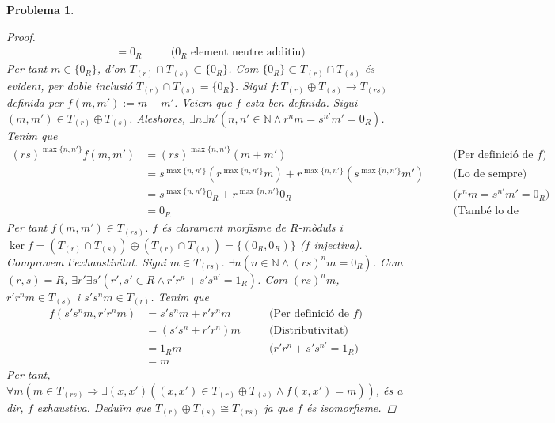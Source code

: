 \documentclass[compress]{article}
\newtheorem{problema}{Problema}
\theoremstyle{definition}
\begin{document}
\begin{problema}
\begin{enumerate}
\begin{proof}
\begin{align*}
                &=0_{R}
                &\quad&\textrm{($0_{R}$ element neutre additiu)}
            \end{align*}
            Per tant $m\in\{0_{R}\}$, d'on $T_{(r)}\cap T_{(s)}\subset\{0_{R}\}$. Com $\{0_{R}\}\subset T_{(r)}\cap T_{(s)}$ és evident, per doble inclusió $T_{(r)}\cap T_{(s)}=\{0_{R}\}$.\newline
            Sigui $f:T_{(r)}\oplus T_{(s)}\rightarrow T_{(rs)}$ definida per $f(m,m'):=m+m'$. Veiem que $f$ esta ben definida. Sigui $(m,m')\in T_{(r)}\oplus T_{(s)}$. Aleshores, $\exists n\exists n'(n,n'\in\mathbb{N}\land r^{n}m=s^{n'}m'=0_{R})$. Tenim que
            \begin{align*}
                (rs)^{\max\{n,n'\}}f(m,m')
                &=(rs)^{\max\{n,n'\}}(m+m')
                &\quad&\textrm{(Per definició de $f$)}\\
                &=s^{\max\{n,n'\}}(r^{\max\{n,n'\}}m)
                +r^{\max\{n,n'\}}(s^{\max\{n,n'\}}m')
                &\quad&\textrm{(Lo de sempre)}\\
                &=s^{\max\{n,n'\}}0_{R}
                +r^{\max\{n,n'\}}0_{R}
                &\quad&\textrm{($r^{n}m=s^{n'}m'=0_{R}$)}\\
                &=0_{R}
                &\quad&\textrm{(També lo de sempre)}
            \end{align*}
            Per tant $f(m,m')\in T_{(rs)}$. $f$ és clarament morfisme de $R$-mòduls i $\ker{f}=(T_{(r)}\cap T_{(s)})\oplus(T_{(r)}\cap T_{(s)})=\{(0_{R},0_{R})\}$ ($f$ injectiva). Comprovem l'exhaustivitat. Sigui $m\in T_{(rs)}$. $\exists n(n\in\mathbb{N}\land(rs)^{n}m=0_{R})$. Com $(r,s)=R$, $\exists r'\exists s'(r',s'\in R\land r'r^{n}+s's^{n'}=1_{R})$. Com $(rs)^{n}m$, $r'r^{n}m\in T_{(s)}$ i $s's^{n}m\in T_{(r)}$. Tenim que
            \begin{align*}
                f(s's^{n}m,r'r^{n}m)
                &=s's^{n}m+r'r^{n}m
                &\quad&\textrm{(Per definició de $f$)}\\
                &=(s's^{n}+r'r^{n})m
                &\quad&\textrm{(Distributivitat)}\\
                &=1_{R}m
                &\quad&\textrm{($r'r^{n}+s's^{n'}=1_{R}$)}\\
                &=m
            \end{align*}
            Per tant, $\forall m(m\in T_{(rs)}\Rightarrow\exists(x,x')((x,x')\in T_{(r)}\oplus T_{(s)}\land f(x,x')=m))$, és a dir, $f$ exhaustiva. Deduïm que $T_{(r)}\oplus T_{(s)}\cong T_{(rs)}$ ja que $f$ és isomorfisme.

\end{proof}
\end{enumerate}
\end{problema}
\end{document}
